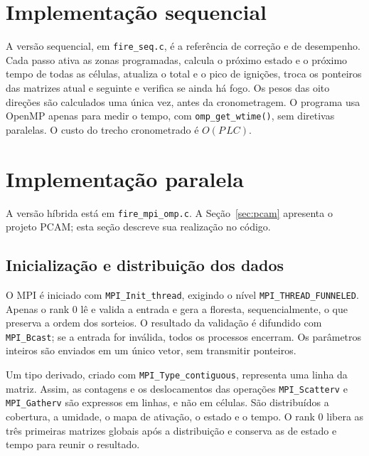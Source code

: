 \documentclass[11pt,a4paper]{article}
\begin{document}
\section{Implementação sequencial}

A versão sequencial, em \texttt{fire\_seq.c}, é a referência
 de correção e de desempenho. Cada passo
ativa as zonas programadas, calcula o próximo estado e o próximo tempo de
todas as células, atualiza o total e o pico de ignições, troca os ponteiros
das matrizes atual e seguinte e verifica se ainda há fogo. Os pesos das oito
direções são calculados uma única vez, antes da cronometragem. O programa
usa OpenMP apenas para medir o tempo, com \texttt{omp\_get\_wtime()}, sem
diretivas paralelas. O custo do trecho cronometrado é $O(P\,LC)$.

\section{Implementação paralela}

A versão híbrida está em \texttt{fire\_mpi\_omp.c}. A
Seção~\ref{sec:pcam} apresenta o projeto PCAM; esta seção descreve sua
realização no código.

\subsection{Inicialização e distribuição dos dados}

O MPI é iniciado com \texttt{MPI\_Init\_thread}, exigindo o nível
\texttt{MPI\_THREAD\_FUNNELED}. Apenas o rank 0 lê e valida a entrada e
gera a floresta, sequencialmente, o que preserva a ordem dos sorteios. O
resultado da validação é difundido com \texttt{MPI\_Bcast}; se a entrada for
inválida, todos os processos encerram. Os parâmetros inteiros são enviados
em um único vetor, sem transmitir ponteiros.

Um tipo derivado, criado com \texttt{MPI\_Type\_contiguous}, representa uma
linha da matriz. Assim, as contagens e os deslocamentos das operações
\texttt{MPI\_Scatterv} e \texttt{MPI\_Gatherv} são expressos em linhas, e
não em células. São distribuídos a cobertura, a umidade, o mapa de ativação,
o estado e o tempo. O rank 0 libera as três primeiras matrizes globais após
a distribuição e conserva as de estado e tempo para reunir o resultado.
\end{document}
